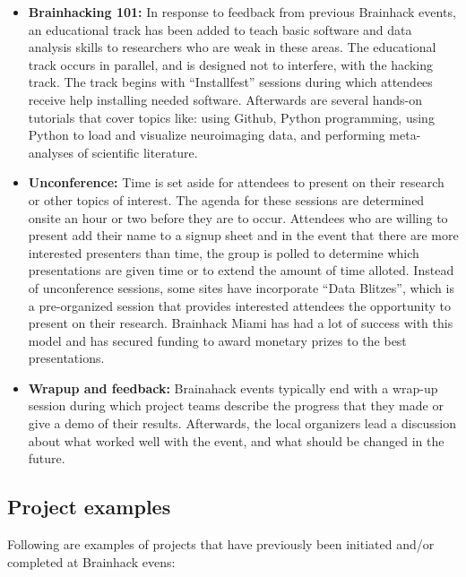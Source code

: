 \documentclass[11pt]{bmc_article_s50}
\begin{document}
\begin{itemize}
\item
  \textbf{Brainhacking 101:} In response to feedback from previous
  Brainhack events, an educational track has been added to teach basic
  software and data analysis skills to researchers who are weak in these
  areas. The educational track occurs in parallel, and is designed not
  to interfere, with the hacking track. The track begins with
  ``Installfest'' sessions during which attendees receive help
  installing needed software. Afterwards are several hands-on tutorials
  that cover topics like: using Github, Python programming, using Python
  to load and visualize neuroimaging data, and performing meta-analyses
  of scientific literature.
\item
  \textbf{Unconference:} Time is set aside for attendees to present on
  their research or other topics of interest. The agenda for these
  sessions are determined onsite an hour or two before they are to
  occur. Attendees who are willing to present add their name to a signup
  sheet and in the event that there are more interested presenters than
  time, the group is polled to determine which presentations are given
  time or to extend the amount of time alloted. Instead of unconference
  sessions, some sites have incorporate ``Data Blitzes'', which is a
  pre-organized session that provides interested attendees the
  opportunity to present on their research. Brainhack Miami has had a
  lot of success with this model and has secured funding to award
  monetary prizes to the best presentations.
\item
  \textbf{Wrapup and feedback:} Brainahack events typically end with a
  wrap-up session during which project teams describe the progress that
  they made or give a demo of their results. Afterwards, the local
  organizers lead a discussion about what worked well with the event,
  and what should be changed in the future.
\end{itemize}

\subsection{Project examples}\label{project-examples}

Following are examples of projects that have previously been initiated
and/or completed at Brainhack evens:
\end{document}
